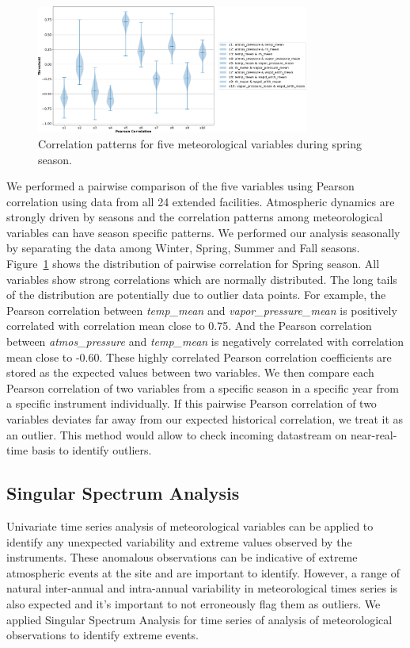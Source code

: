 \begin{figure}[ht]
    \centering
    \includegraphics[width=0.8\textwidth]{figures/Spring.png}
    \caption{Correlation patterns for five meteorological variables
		during spring season.}
    \label{fig:pc}
\end{figure}

We performed a pairwise comparison of the five variables using Pearson
correlation using data from all 24 extended facilities. Atmospheric
dynamics are strongly driven by seasons and the correlation patterns
among meteorological variables can have season specific patterns. We
performed our analysis seasonally by separating the data among Winter, Spring,
Summer and Fall seasons. Figure~\ref{fig:pc} shows the distribution of
pairwise correlation for Spring season. All variables show strong
correlations which are normally distributed. The long tails of the
distribution are potentially due to outlier data points. 
For example, the Pearson correlation between
\textit{temp\_mean} and \textit{vapor\_pressure\_mean} is positively
correlated with correlation mean close to 0.75. And the Pearson
correlation between \textit{atmos\_pressure} and \textit{temp\_mean} is
negatively correlated with correlation mean close to -0.60. These highly
correlated Pearson correlation coefficients are stored as the expected
values between two variables. We then compare each Pearson correlation
of two variables from a specific season in a specific year from a
specific instrument individually. If this pairwise Pearson correlation
of two variables deviates far away from our expected historical
correlation, we treat it as an outlier. This method would allow to check
incoming datastream on near-real-time basis to identify outliers.

\subsection{Singular Spectrum Analysis}
Univariate time series analysis of meteorological variables can be
applied to identify any unexpected variability and extreme values
observed by the instruments. These anomalous observations can be
indicative of extreme atmospheric events at the site and are important
to identify. However, a range of natural inter-annual and intra-annual variability in
meteorological times series is also expected and it's important to not
erroneously flag them as outliers. We applied Singular Spectrum Analysis
for time series of analysis of meteorological observations to identify
extreme events.

